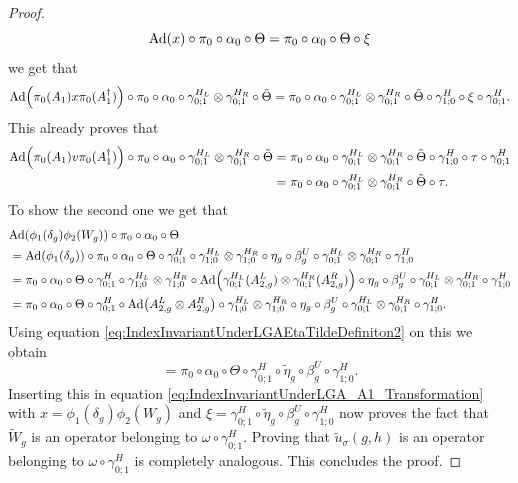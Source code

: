 \documentclass[12pt,a4paper,twoside]{article}
\let\originalleft\left
\let\originalright\right
\renewcommand{\left}{\mathopen{}\mathclose\bgroup\originalleft}
\renewcommand{\right}{\aftergroup\egroup\originalright}
\newcommand{\Ad}[1]{\textrm{Ad}\left(#1\right)}
\theoremstyle{definition}
\numberwithin{equation}{section}
\begin{document}
\begin{proof}
	\begin{equation}
		\Ad{x}\circ\pi_0\circ\alpha_0\circ\Theta=\pi_0\circ\alpha_0\circ\Theta\circ\xi
	\end{equation}
	we get that
	\begin{equation}\label{eq:IndexInvariantUnderLGA_A1_Transformation}
		\Ad{\pi_0(A_1)x\pi_0(A_1^\dagger)}\circ\pi_0\circ\alpha_0\circ\gamma^{H_L}_{0;1}\otimes\gamma^{H_R}_{0;1}\circ\tilde{\Theta}=\pi_0\circ\alpha_0\circ\gamma^{H_L}_{0;1}\otimes\gamma^{H_R}_{0;1}\circ\tilde{\Theta}\circ\gamma^H_{1;0}\circ\xi\circ\gamma^H_{0;1}.
	\end{equation}
	This already proves that
	\begin{align}
		\Ad{\pi_0(A_1)v\pi_0(A_1^\dagger)}\circ\pi_0\circ\alpha_0\circ\gamma^{H_L}_{0;1}\otimes\gamma^{H_R}_{0;1}\circ\tilde{\Theta}&=\pi_0\circ\alpha_0\circ\gamma^{H_L}_{0;1}\otimes\gamma^{H_R}_{0;1}\circ\tilde{\Theta}\circ\gamma^H_{1;0}\circ\tau\circ\gamma^H_{0;1}\\
		&=\pi_0\circ\alpha_0\circ\gamma^{H_L}_{0;1}\otimes\gamma^{H_R}_{0;1}\circ\tilde{\Theta}\circ\tau.
	\end{align}
	To show the second one we get that
	\begin{align}
		&\Ad{\phi_1(\delta_g)\phi_2(W_g)}\circ\pi_0\circ\alpha_0\circ\Theta\\
		&=\Ad{\phi_1(\delta_g)}\circ\pi_0\circ\alpha_0\circ\Theta\circ\gamma^{H}_{0;1}\circ\gamma^{H_L}_{1;0}\otimes\gamma^{H_R}_{1;0}\circ\eta_g\circ\beta_g^U\circ\gamma^{H_L}_{0;1}\otimes\gamma^{H_R}_{0;1}\circ\gamma^H_{1;0}\\
		&=\pi_0\circ\alpha_0\circ\Theta\circ\gamma^{H}_{0;1}\circ\gamma^{H_L}_{1;0}\otimes\gamma^{H_R}_{1;0}\circ\Ad{\gamma^{H_L}_{0;1}(A_{2,g}^L)\otimes\gamma^{H_R}_{0;1}(A_{2,g}^R)}\circ\eta_g\circ\beta_g^U\circ\gamma^{H_L}_{0;1}\otimes\gamma^{H_R}_{0;1}\circ\gamma^H_{1;0}\\
		&=\pi_0\circ\alpha_0\circ\Theta\circ\gamma^{H}_{0;1}\circ\Ad{A_{2,g}^L\otimes A_{2,g}^R}\circ\gamma^{H_L}_{1;0}\otimes\gamma^{H_R}_{1;0}\circ\eta_g\circ\beta_g^U\circ\gamma^{H_L}_{0;1}\otimes\gamma^{H_R}_{0;1}\circ\gamma^H_{1;0}.
	\end{align}
	Using equation \eqref{eq:IndexInvariantUnderLGAEtaTildeDefiniton2} on this we obtain
	\begin{equation}
		=\pi_0\circ\alpha_0\circ\Theta\circ\gamma^H_{0;1}\circ\tilde{\eta}_g\circ\beta_g^U\circ\gamma^H_{1;0}.
	\end{equation}
	Inserting this in equation \eqref{eq:IndexInvariantUnderLGA_A1_Transformation} with $x=\phi_1(\delta_g)\phi_2(W_g)$ and $\xi=\gamma^H_{0;1}\circ\tilde{\eta}_g\circ\beta_g^U\circ\gamma^H_{1;0}$ now proves the fact that $\tilde{W}_g$ is an operator belonging to $\omega\circ\gamma^H_{0;1}$. Proving that $\tilde u_\sigma(g,h)$ is an operator belonging to $\omega\circ\gamma_{0;1}^H$ is completely analogous. This concludes the proof.
\end{proof}
\end{document}
